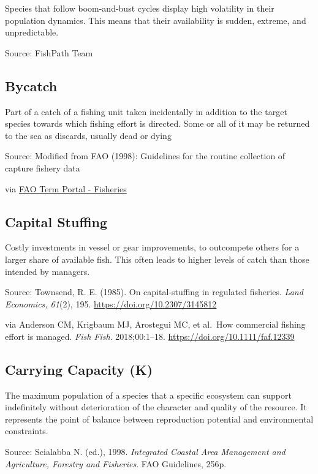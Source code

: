 \documentclass[
  11pt,
]{book}
\begin{document}
Species that follow boom-and-bust cycles display high volatility in their population dynamics. This means that their availability is sudden, extreme, and unpredictable.

Source: FishPath Team

\hypertarget{bycatch}{%
\subsection{Bycatch}\label{bycatch}}

Part of a catch of a fishing unit taken incidentally in addition to the target species towards which fishing effort is directed. Some or all of it may be returned to the sea as discards, usually dead or dying

Source: Modified from FAO (1998): Guidelines for the routine collection of capture fishery data

via \href{http://www.fao.org/fishery/glossary/en}{FAO Term Portal - Fisheries}

\hypertarget{capital-stuffing}{%
\subsection{Capital Stuffing}\label{capital-stuffing}}

Costly investments in vessel or gear improvements, to outcompete others for a larger share of available fish. This often leads to higher levels of catch than those intended by managers.

Source: Townsend, R. E. (1985). On capital-stuffing in regulated fisheries. \emph{Land
Economics, 61}(2), 195. \url{https://doi.org/10.2307/3145812}

via Anderson CM, Krigbaum MJ,
Arostegui MC, et al.~How commercial fishing effort is managed. \emph{Fish Fish}. 2018;00:1--18. \url{https://doi.org/10.1111/faf.12339}

\hypertarget{carrying-capacity-k}{%
\subsection{Carrying Capacity (K)}\label{carrying-capacity-k}}

The maximum population of a species that a specific ecosystem can support indefinitely without deterioration of the character and quality of the resource. It represents the point of balance between reproduction potential and environmental constraints.

Source: Scialabba N. (ed.), 1998. \emph{Integrated Coastal Area Management and Agriculture, Forestry and Fisheries}. FAO Guidelines, 256p.
\end{document}
